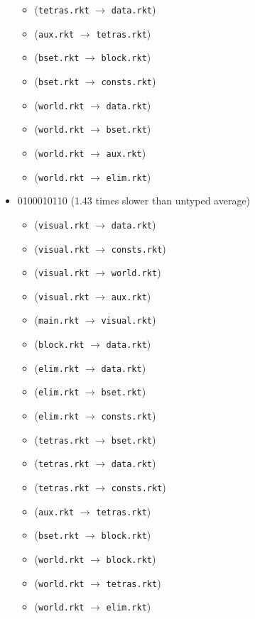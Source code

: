 \documentclass{article}
\newcommand{\mono}[1]{\texttt{#1}}
\begin{document}
\begin{itemize}
\begin{itemize}
  \item (\mono{tetras.rkt} $\rightarrow$ \mono{data.rkt})
  \item (\mono{aux.rkt} $\rightarrow$ \mono{tetras.rkt})
  \item (\mono{bset.rkt} $\rightarrow$ \mono{block.rkt})
  \item (\mono{bset.rkt} $\rightarrow$ \mono{consts.rkt})
  \item (\mono{world.rkt} $\rightarrow$ \mono{data.rkt})
  \item (\mono{world.rkt} $\rightarrow$ \mono{bset.rkt})
  \item (\mono{world.rkt} $\rightarrow$ \mono{aux.rkt})
  \item (\mono{world.rkt} $\rightarrow$ \mono{elim.rkt})
  \end{itemize}
\item 0100010110 (1.43 times slower than untyped average)
  \begin{itemize}
  \item (\mono{visual.rkt} $\rightarrow$ \mono{data.rkt})
  \item (\mono{visual.rkt} $\rightarrow$ \mono{consts.rkt})
  \item (\mono{visual.rkt} $\rightarrow$ \mono{world.rkt})
  \item (\mono{visual.rkt} $\rightarrow$ \mono{aux.rkt})
  \item (\mono{main.rkt} $\rightarrow$ \mono{visual.rkt})
  \item (\mono{block.rkt} $\rightarrow$ \mono{data.rkt})
  \item (\mono{elim.rkt} $\rightarrow$ \mono{data.rkt})
  \item (\mono{elim.rkt} $\rightarrow$ \mono{bset.rkt})
  \item (\mono{elim.rkt} $\rightarrow$ \mono{consts.rkt})
  \item (\mono{tetras.rkt} $\rightarrow$ \mono{bset.rkt})
  \item (\mono{tetras.rkt} $\rightarrow$ \mono{data.rkt})
  \item (\mono{tetras.rkt} $\rightarrow$ \mono{consts.rkt})
  \item (\mono{aux.rkt} $\rightarrow$ \mono{tetras.rkt})
  \item (\mono{bset.rkt} $\rightarrow$ \mono{block.rkt})
  \item (\mono{world.rkt} $\rightarrow$ \mono{block.rkt})
  \item (\mono{world.rkt} $\rightarrow$ \mono{tetras.rkt})
  \item (\mono{world.rkt} $\rightarrow$ \mono{elim.rkt})

\end{itemize}
\end{itemize}
\end{document}
